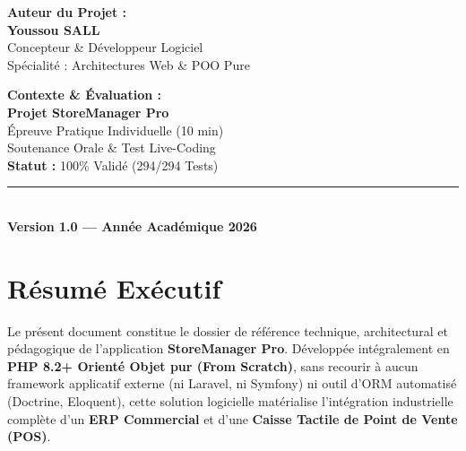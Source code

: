\documentclass[11pt,a4paper,titlepage,twoside,openright]{report}
\begin{document}
\begin{titlepage}
    \begin{minipage}[t]{0.45\textwidth}
        \textbf{\color{primaryNavy}\large Auteur du Projet :}\\[0.2cm]
        \large\textbf{Youssou SALL}\\
        \normalsize Concepteur \& Développeur Logiciel\\
        \small Spécialité : Architectures Web \& POO Pure
    \end{minipage}
    \hfill
    \begin{minipage}[t]{0.45\textwidth}
        \begin{flushright}
            \textbf{\color{primaryNavy}\large Contexte \& Évaluation :}\\[0.2cm]
            \textbf{Projet StoreManager Pro}\\
            Épreuve Pratique Individuelle (10 min)\\
            Soutenance Orale \& Test Live-Coding\\
            \textbf{Statut :} 100\% Validé (294/294 Tests)
        \end{flushright}
    \end{minipage}
    
    \vfill
    
    \begin{center}
        \rule{0.8\textwidth}{0.6pt}\\[0.3cm]
        \color{darkSlate}\textbf{Version 1.0 — Année Académique 2026}
    \end{center}
\end{titlepage}


\chapter*{Résumé Exécutif}

Le présent document constitue le dossier de référence technique, architectural et pédagogique de l'application \textbf{StoreManager Pro}. Développée intégralement en \textbf{PHP 8.2+ Orienté Objet pur (From Scratch)}, sans recourir à aucun framework applicatif externe (ni Laravel, ni Symfony) ni outil d'ORM automatisé (Doctrine, Eloquent), cette solution logicielle matérialise l'intégration industrielle complète d'un \textbf{ERP Commercial} et d'une \textbf{Caisse Tactile de Point de Vente (POS)}.
\end{document}
